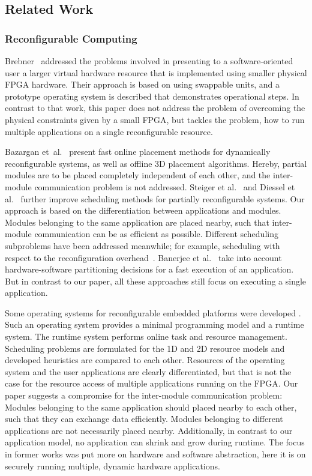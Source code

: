 \documentclass[10pt,journal]{IEEEtran}
\begin{document}
\subsection{Related Work}
\subsubsection{Reconfigurable Computing}
Brebner~\cite{brebner_virtual_1996,brebner_swappable_1997}
addressed the problems involved in presenting to a software-oriented user 
a larger virtual hardware resource that is
implemented using smaller physical FPGA hardware. Their
approach is based on using swappable units, and a prototype operating
system is described that demonstrates operational steps. In contrast
to that work, this paper does not address the problem of overcoming the
physical constraints given by a small FPGA, but tackles the problem,
how to run multiple applications on a single reconfigurable resource.

Bazargan et~al.~\cite{bazargan_fast_2000} present fast online
placement methods for dynamically reconfigurable systems, as well as
offline 3D placement algorithms. Hereby, partial modules are to be
placed completely independent of each other, and the inter-module
communication problem is not addressed. Steiger et 
al.~\cite{steiger_online_2003} and Diessel et 
al.~\cite{diessel_dynamic_2000} further improve scheduling methods for
partially reconfigurable systems. Our approach is based on the
differentiation between applications and modules. Modules belonging to
the same application are placed nearby, such that inter-module
communication can be as efficient as possible.  Different scheduling
subproblems have been addressed meanwhile; for example, 
scheduling with respect to the reconfiguration 
overhead~\cite{resano_hybrid_2005}.
Banerjee et al.~\cite{banerjee_physically-aware_2005}
take into account hardware-software partitioning decisions for a
fast execution of an application. But in contrast to our paper, all
these approaches still focus on executing a single application.

Some operating systems for reconfigurable embedded platforms were developed
\cite{steiger_operating_2004,wigley_development_2001,walder_reconfigurable_2003}. Such an operating
system provides a minimal programming model and a runtime system. The
runtime system performs online task and resource
management. Scheduling problems are formulated for the 1D and 2D
resource models and developed heuristics are compared to each
other. Resources of the operating system and the user applications are
clearly differentiated, but that is not the case for the resource
access of multiple applications running on the FPGA. Our
paper suggests a compromise for the inter-module communication
problem: Modules belonging to the same application should placed 
nearby to each other, such that they can exchange data
efficiently. Modules belonging to different applications are not
necessarily placed nearby. Additionally, in contrast to our application model,
no application can shrink and grow during runtime. The
focus in former works was put more on hardware and software
abstraction, here it is on securely running multiple, dynamic
hardware applications.
\end{document}
